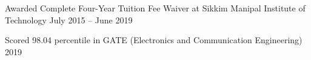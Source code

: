 \begin{zitemize}
 \item Awarded Complete Four-Year Tuition Fee Waiver at Sikkim Manipal Institute of Technology   \hfill  July 2015 -- June 2019

 \item Scored 98.04 percentile in GATE (Electronics and Communication Engineering) \hfill 2019

\end{zitemize}
